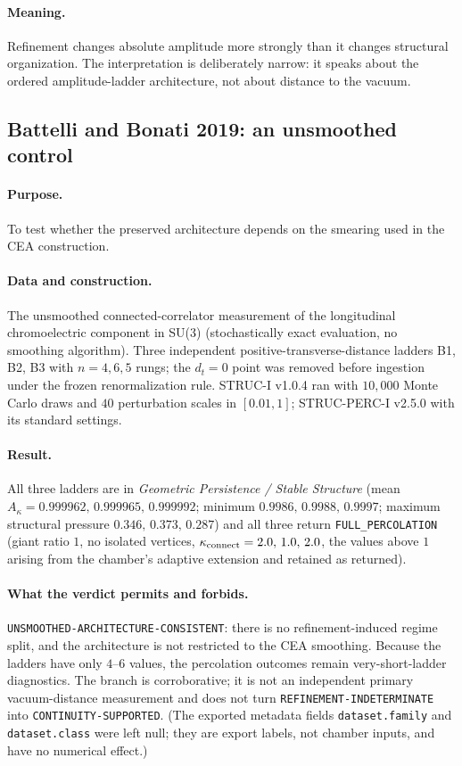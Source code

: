 \documentclass[11pt,a4paper]{article}
\theoremstyle{definition}
\theoremstyle{remark}
\begin{document}
\paragraph{Meaning.} Refinement changes absolute amplitude more strongly than it changes structural organization. The interpretation is deliberately narrow: it speaks about the ordered amplitude-ladder architecture, not about distance to the vacuum.

\subsection{Battelli and Bonati 2019: an unsmoothed control}\label{ssec:battelli}
\paragraph{Purpose.} To test whether the preserved architecture depends on the smearing used in the CEA construction.
\paragraph{Data and construction.} The unsmoothed connected-correlator measurement of the longitudinal chromoelectric component in SU(3) \cite{Battelli19} (stochastically exact evaluation, no smoothing algorithm). Three independent positive-transverse-distance ladders B1, B2, B3 with $n=4,6,5$ rungs; the $d_t=0$ point was removed before ingestion under the frozen renormalization rule. STRUC-I v1.0.4 ran with $10{,}000$ Monte Carlo draws and $40$ perturbation scales in $[0.01,1]$; STRUC-PERC-I v2.5.0 with its standard settings.
\paragraph{Result.} All three ladders are in \emph{Geometric Persistence / Stable Structure} (mean $A_\kappa=0.999962,\,0.999965,\,0.999992$; minimum $0.9986,\,0.9988,\,0.9997$; maximum structural pressure $0.346,\,0.373,\,0.287$) and all three return \texttt{FULL\_PERCOLATION} (giant ratio $1$, no isolated vertices, $\kappa_{\rm connect}=2.0,\,1.0,\,2.0$, the values above $1$ arising from the chamber's adaptive extension and retained as returned).
\paragraph{What the verdict permits and forbids.} \texttt{UNSMOOTHED-\allowbreak{}ARCHITECTURE-\allowbreak{}CONSISTENT}: there is no refinement-induced regime split, and the architecture is not restricted to the CEA smoothing. Because the ladders have only $4$--$6$ values, the percolation outcomes remain very-short-ladder diagnostics. The branch is corroborative; it is not an independent primary vacuum-distance measurement and does not turn \texttt{REFINEMENT-\allowbreak{}INDETERMINATE} into \texttt{CONTINUITY-\allowbreak{}SUPPORTED}. (The exported metadata fields \texttt{dataset.family} and \texttt{dataset.class} were left null; they are export labels, not chamber inputs, and have no numerical effect.)
\end{document}
